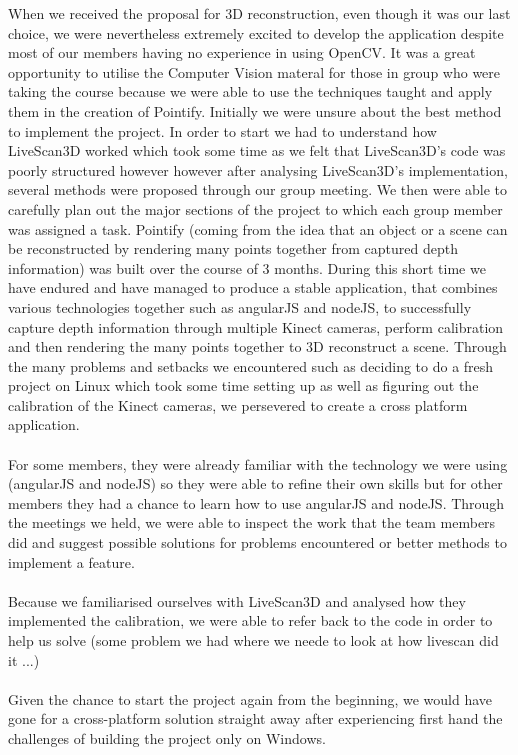 \documentclass{article}
\begin{document}
When we received the proposal for 3D reconstruction, even though it was our last choice, we were nevertheless extremely excited to develop the application despite most of our members having no experience in using OpenCV. It was a great opportunity to utilise the Computer Vision materal for those in group who were taking the course because we were able to use the techniques taught and apply them in the creation of Pointify.  Initially we were unsure about the best method to implement the project. In order to start we had to understand how LiveScan3D worked which took some time as we felt that LiveScan3D's code was poorly structured however however after analysing LiveScan3D's implementation, several methods were proposed through our group meeting. We then were able to carefully plan out the major sections of the project to which each group member was assigned a task. Pointify (coming from the idea that an object or a scene can be reconstructed by rendering many points together from captured depth information) was built over the course of 3 months. During this short time we have endured and have managed to produce a stable application, that combines various technologies together such as angularJS and nodeJS, to successfully capture depth information through multiple Kinect cameras, perform calibration and then rendering the many points together to 3D reconstruct a scene. Through the many problems and setbacks we encountered such as deciding to do a fresh project on Linux which took some time setting up as well as figuring out the calibration of the Kinect cameras, we persevered to create a cross platform application. 
\\\\
For some members, they were already familiar with the technology we were using (angularJS and nodeJS) so they were able to refine their own skills but for other members they had a chance to learn how to use angularJS and nodeJS. Through the meetings we held, we were able to inspect the work that the team members did and suggest possible solutions for problems encountered or better methods to implement a feature.
\\\\
Because we familiarised ourselves with LiveScan3D and analysed how they implemented the calibration, we were able to refer back to the code in order to help us solve (some problem we had where we neede to look at how livescan did it ...)   
\\\\
Given the chance to start the project again from the beginning, we would have gone for a cross-platform solution straight away after experiencing first hand the challenges of building the project only on Windows. 
\end{document}
